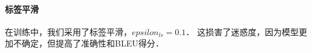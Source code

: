 



\paragraph{标签平滑} 在训练中，我们采用了标签平滑，$epsilon_{ls}=0.1$\citep{DBLP:journals/corr/SzegedyVISW15}． 这损害了迷惑度，因为模型更加不确定，但提高了准确性和BLEU得分．
